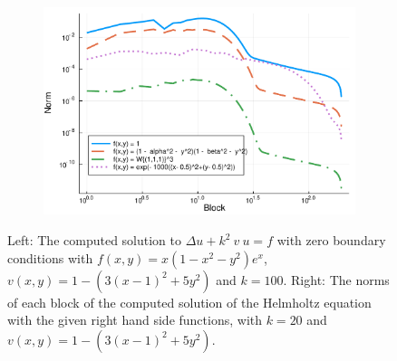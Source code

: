 \documentclass[11pt, oneside]{article}   	%
\begin{document}
\begin{figure}[t]
\begin{subfigure}{0.3\textwidth}
	\end{subfigure}
	\begin{subfigure}{0.5\textwidth}
	\includegraphics[scale=0.5]{solutionblocknorms-helmholtz-diskslice-alpha=0p2-beta=0p8-N=196-k=20}
	\centering
	\end{subfigure}
	\caption{Left: The computed solution to $\Delta u + k^2 \: v \: u = f$ with zero boundary conditions with $f(x,y) = x(1-x^2-y^2)e^x$, $v(x,y) = 1 - (3(x-1)^2 + 5y^2)$ and $k = 100$. Right: The norms of each block of the computed solution of the Helmholtz equation with the given right hand side functions, with $k=20$ and $v(x,y) = 1 - (3(x-1)^2 + 5y^2)$.}
	\centering
	\label{fig:helmholtz}
\end{figure}
\end{document}
